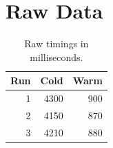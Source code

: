 \chapter{Raw Data}\label{app:data}

\begin{table}[ht]
  \centering
  \caption{Raw timings in milliseconds.}
  \begin{tabular}{rrr}
    \toprule
    Run & Cold & Warm \\
    \midrule
    1 & 4300 & 900 \\
    2 & 4150 & 870 \\
    3 & 4210 & 880 \\
    \bottomrule
  \end{tabular}
\end{table}
